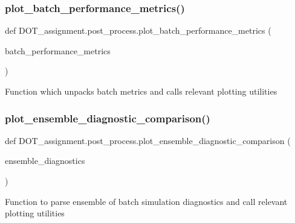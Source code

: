 \subsubsection{\texorpdfstring{plot\_batch\_performance\_metrics()}{plot\_batch\_performance\_metrics()}}
{\footnotesize\ttfamily def D\+O\+T\+\_\+assignment.\+post\+\_\+process.\+plot\+\_\+batch\+\_\+performance\+\_\+metrics (\begin{DoxyParamCaption}\item[{}]{batch\+\_\+performance\+\_\+metrics }\end{DoxyParamCaption})}

\begin{DoxyVerb}Function which unpacks batch metrics and calls relevant plotting utilities
\end{DoxyVerb}
 \mbox{\label{namespace_d_o_t__assignment_1_1post__process_ac7d20cd04bb73f5a144e1a84f7aae0a1}} 
\subsubsection{\texorpdfstring{plot\_ensemble\_diagnostic\_comparison()}{plot\_ensemble\_diagnostic\_comparison()}}
{\footnotesize\ttfamily def D\+O\+T\+\_\+assignment.\+post\+\_\+process.\+plot\+\_\+ensemble\+\_\+diagnostic\+\_\+comparison (\begin{DoxyParamCaption}\item[{}]{ensemble\+\_\+diagnostics }\end{DoxyParamCaption})}

\begin{DoxyVerb}Function to parse ensemble of batch simulation diagnostics and call relevant plotting utilities
\end{DoxyVerb}
 \mbox{\label{namespace_d_o_t__assignment_1_1post__process_acd3fd5ffd64792ddf60d6b5f258dd422}} 
